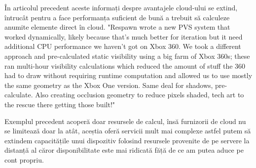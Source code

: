 În articolul precedent \cite{leadbetter_2014} aceste informați despre avantajele cloud-ului se extind,
întrucât pentru a face performanța suficient de bună a trebuit să calculeze anumite elemente direct în cloud.
"Respawn wrote a new PVS system that worked dynamically, likely because that's much better for iteration but it need additional CPU performance we haven't got on 
Xbox 360. We took a different approach and pre-calculated static visibility using a 
big farm of Xbox 360s; these ran multi-hour visibility calculations which reduced the 
amount of stuff the 360 had to draw without requiring runtime computation and allowed us 
to use mostly the same geometry as the Xbox One version.
Same deal for shadows, pre-calculate. Also creating occlusion geometry to reduce 
pixels shaded, tech art to the rescue there getting those built!"

Exemplul precedent acoperă doar resursele de calcul, însă furnizorii de cloud nu se limitează doar la atât,
aceștia oferă servicii mult mai complexe astfel putem să extindem capacitățile unui dispozitiv folosind 
resursele provenite de pe servere la distanță al căror disponibilitate este mai ridicată făță de ce
am putea aduce pe cont propriu.


